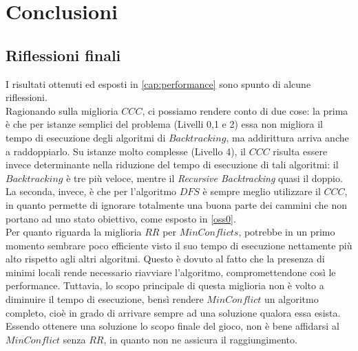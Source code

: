 
\chapter{Conclusioni}
\label{cap:conclusioni}

\section{Riflessioni finali}
I risultati ottenuti ed esposti in \ref{cap:performance} sono spunto di alcune riflessioni.\\

Ragionando sulla miglioria $CCC$, ci possiamo rendere conto di due cose: la prima è che per istanze semplici del problema (Livelli 0,1 e 2) essa non migliora il tempo di esecuzione degli algoritmi di $Backtracking$, ma addirittura arriva anche a raddoppiarlo. Su istanze molto complesse (Livello 4), il $CCC$ risulta essere invece determinante nella riduzione del tempo di esecuzione di tali algoritmi: il $Backtracking$ è tre più veloce, mentre il \textit{Recursive Backtracking} quasi il doppio. \\
La seconda, invece, è che per l'algoritmo $DFS$ è sempre meglio utilizzare il $CCC$, in quanto permette di ignorare totalmente una buona parte dei cammini che non portano ad uno stato obiettivo, come esposto in \ref{oss0}.\\

Per quanto riguarda la miglioria $RR$ per $MinConflicts$, potrebbe in un primo momento sembrare poco efficiente visto il suo tempo di esecuzione nettamente più alto rispetto agli altri algoritmi. Questo è dovuto al fatto che la presenza di minimi locali rende necessario riavviare l'algoritmo, compromettendone così le performance. Tuttavia, lo scopo principale di questa miglioria non è volto a diminuire il tempo di esecuzione, bensì rendere $MinConflict$ un algoritmo completo, cioè in grado di arrivare sempre ad una soluzione qualora essa esista. Essendo ottenere una soluzione lo scopo finale del gioco, non è bene affidarsi al $MinConflict$ senza $RR$, in quanto non ne assicura il raggiungimento.\\

